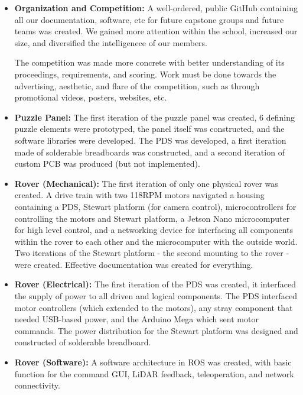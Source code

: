 \documentclass[a4paper, 10pt]{article}
\begin{document}
	\begin{itemize}
		\item \textbf{Organization and Competition:} A well-ordered, public GitHub containing all our documentation, software, etc for future capstone groups and future teams was created. We gained more attention within the school, increased our size, and diversified the intelligenece of our members.
		
		The competition was made more concrete with better understanding of its proceedings, requirements, and scoring. Work must be done towards the advertising, aesthetic, and flare of the competition, such as through promotional videos, posters, websites, etc.
		
		\item \textbf{Puzzle Panel:} The first iteration of the puzzle panel was created, 6 defining puzzle elements were prototyped, the panel itself was constructed, and the software libraries were developed. The PDS was developed, a first iteration made of solderable breadboards was constructed, and a second iteration of custom PCB was produced (but not implemented). 
		
		\item \textbf{Rover (Mechanical):} The first iteration of only one physical rover was created. A drive train with two 118RPM motors navigated a housing containing a PDS, Stewart platform (for camera control), microcontrollers for controlling the motors and Stewart platform, a Jetson Nano microcomputer for high level control, and a networking device for interfacing all components within the rover to each other and the microcomputer  with the outside world. Two iterations of the Stewart platform - the second mounting to the rover - were created. Effective documentation was created for everything.
		
		\item \textbf{Rover (Electrical):} The first iteration of the PDS was created, it interfaced the supply of power to all driven and logical components. The PDS interfaced motor controllers (which extended to the motors), any stray component that needed USB-based power, and the Arduino Mega which sent motor commands. The power distribution for the Stewart platform was designed and constructed of solderable breadboard. 
		
		\item \textbf{Rover (Software):} A software architecture in ROS was created, with basic function for the command GUI, LiDAR feedback, teleoperation, and network connectivity. 
	\end{itemize}
		
\end{document}
